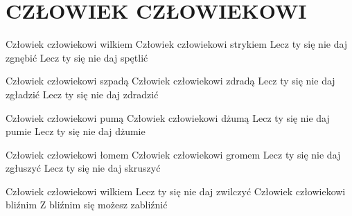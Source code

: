 \documentclass[../../../songbook.tex]{subfiles}
\begin{document}
\TabPositions{8cm} %
\section*{CZŁOWIEK CZŁOWIEKOWI}
{}
\vspace{0.5cm}

Człowiek człowiekowi wilkiem 	 \newline
Człowiek człowiekowi strykiem 	 \newline
Lecz ty się nie daj zgnębić		\newline
Lecz ty się nie daj spętlić		\newline

\-\hspace{1cm} Człowiek człowiekowi szpadą	\newline
\-\hspace{1cm} Człowiek człowiekowi zdradą	\newline
\-\hspace{1cm} Lecz ty się nie daj zgładzić	\newline
\-\hspace{1cm} Lecz ty się nie daj zdradzić	\newline

Człowiek człowiekowi pumą 		 \newline
Człowiek człowiekowi dżumą 		 \newline
Lecz ty się nie daj pumie		\newline
Lecz ty się nie daj dżumie		\newline

\-\hspace{1cm} Człowiek człowiekowi łomem	\newline
\-\hspace{1cm} Człowiek człowiekowi gromem	\newline
\-\hspace{1cm} Lecz ty się nie daj zgłuszyć	\newline
\-\hspace{1cm} Lecz ty się nie daj skruszyć	\newline

Człowiek człowiekowi wilkiem		 \newline
Lecz ty się nie daj zwilczyć 		 \newline
Człowiek człowiekowi bliźnim 		 \newline
Z bliźnim się możesz zabliźnić 		 \newline
\end{document}
